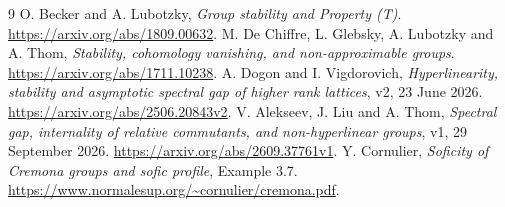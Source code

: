 \documentclass[11pt]{article}
\begin{document}
\begin{thebibliography}{9}
 O. Becker and A. Lubotzky, \emph{Group stability and Property (T)}. \url{https://arxiv.org/abs/1809.00632}.
 M. De Chiffre, L. Glebsky, A. Lubotzky and A. Thom, \emph{Stability, cohomology vanishing, and non-approximable groups}. \url{https://arxiv.org/abs/1711.10238}.
 A. Dogon and I. Vigdorovich, \emph{Hyperlinearity, stability and asymptotic spectral gap of higher rank lattices}, v2, 23 June 2026. \url{https://arxiv.org/abs/2506.20843v2}.
 V. Alekseev, J. Liu and A. Thom, \emph{Spectral gap, internality of relative commutants, and non-hyperlinear groups}, v1, 29 September 2026. \url{https://arxiv.org/abs/2609.37761v1}.
 Y. Cornulier, \emph{Soficity of Cremona groups and sofic profile}, Example 3.7. \url{https://www.normalesup.org/~cornulier/cremona.pdf}.
\end{thebibliography}
\end{document}
